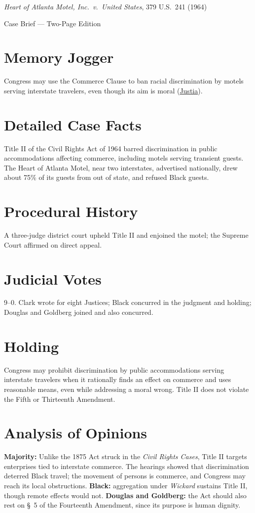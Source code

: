 \documentclass[12pt]{article}
\begin{document}
\begin{center}
{\LARGE \textit{Heart of Atlanta Motel, Inc.\ v.\ United States}, 379 U.S.\ 241 (1964)\par}
\vspace{0.5em}
{\large Case Brief --- Two-Page Edition\par}
\end{center}

\section{Memory Jogger}
Congress may use the Commerce Clause to ban racial discrimination by motels serving interstate travelers, even though its aim is moral (\href{https://supreme.justia.com/cases/federal/us/379/241/}{Justia}).

\section{Detailed Case Facts}
Title II of the Civil Rights Act of 1964 barred discrimination in public accommodations affecting commerce, including motels serving transient guests. The Heart of Atlanta Motel, near two interstates, advertised nationally, drew about 75\% of its guests from out of state, and refused Black guests.

\section{Procedural History}
A three-judge district court upheld Title II and enjoined the motel; the Supreme Court affirmed on direct appeal.

\section{Judicial Votes}
9--0. Clark wrote for eight Justices; Black concurred in the judgment and holding; Douglas and Goldberg joined and also concurred.

\section{Holding}
Congress may prohibit discrimination by public accommodations serving interstate travelers when it rationally finds an effect on commerce and uses reasonable means, even while addressing a moral wrong. Title II does not violate the Fifth or Thirteenth Amendment.

\section{Analysis of Opinions}
\textbf{Majority:} Unlike the 1875 Act struck in the \textit{Civil Rights Cases}, Title II targets enterprises tied to interstate commerce. The hearings showed that discrimination deterred Black travel; the movement of persons is commerce, and Congress may reach its local obstructions. \textbf{Black:} aggregation under \textit{Wickard} sustains Title II, though remote effects would not. \textbf{Douglas and Goldberg:} the Act should also rest on \S~5 of the Fourteenth Amendment, since its purpose is human dignity.
\end{document}
